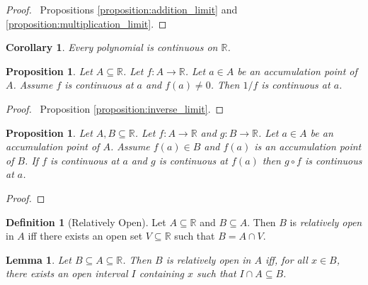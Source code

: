 \documentclass{article}
\let\qed\relax
\newtheorem{lemma}[axiom]{Lemma}
\newtheorem{proposition}[axiom]{Proposition}
\newtheorem{corollary}{Corollary}[axiom]
\theoremstyle{definition}
\newtheorem{definition}[axiom]{Definition}
\begin{document}
\begin{proof}
    \pf\ Propositions \ref{proposition:addition_limit} and \ref{proposition:multiplication_limit}. \qed
\end{proof}

\begin{corollary}
    Every polynomial is continuous on $\mathbb{R}$.
\end{corollary}

\begin{proposition}
    Let $A \subseteq \mathbb{R}$. Let $f : A \rightarrow \mathbb{R}$. Let $a \in A$
    be an accumulation point of $A$. Assume $f$ is continuous at $a$ and $f(a) \neq 0$. Then $1/f$ is continuous at $a$.
\end{proposition}

\begin{proof}
    \pf\ Proposition \ref{proposition:inverse_limit}. \qed
\end{proof}

\begin{proposition}
    Let $A, B \subseteq \mathbb{R}$. Let $f : A \rightarrow \mathbb{R}$ and $g : B \rightarrow \mathbb{R}$. Let $a \in A$
    be an accumulation point of $A$. Assume $f(a) \in B$ and $f(a)$ is an accumulation point of $B$. If $f$ is continuous at $a$
    and $g$ is continuous at $f(a)$ then $g \circ f$ is continuous at $a$.
\end{proposition}

\begin{proof}
    \pf
    \qed
\end{proof}

\begin{definition}[Relatively Open]
    Let $A \subseteq \mathbb{R}$ and $B \subseteq A$. Then $B$ is \emph{relatively open} in $A$ iff there exists an open set
    $V \subseteq \mathbb{R}$ such that $B = A \cap V$.
\end{definition}

\begin{lemma}
    \label{lemma:relatively_open}
    Let $B \subseteq A \subseteq \mathbb{R}$. Then $B$ is relatively open in $A$ iff, for all $x \in B$, there exists an open interval $I$
    containing $x$ such that $I \cap A \subseteq B$.
\end{lemma}
\end{document}
